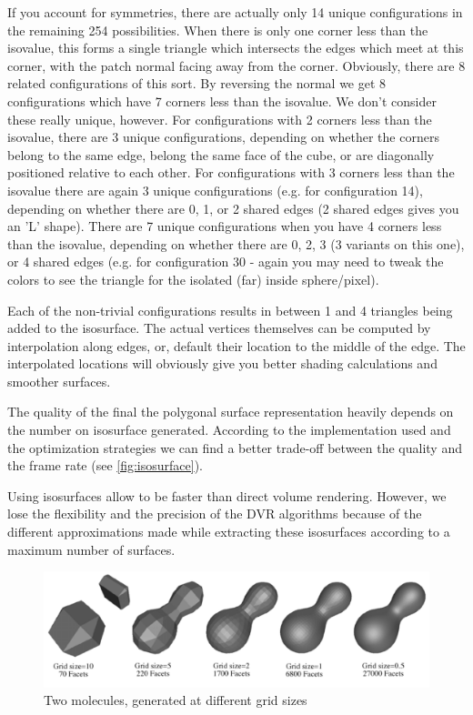 If you account for symmetries, there are actually only 14 unique configurations in the remaining 254 possibilities. When there is only one corner less than the isovalue, this forms a single triangle which intersects the edges which meet at this corner, with the patch normal facing away from the corner. Obviously, there are 8 related configurations of this sort. By reversing the normal we get 8 configurations which have 7 corners less than the isovalue. We don't consider these really unique, however. For configurations with 2 corners less than the isovalue, there are 3 unique configurations, depending on whether the corners belong to the same edge, belong the same face of the cube, or are diagonally positioned relative to each other. For configurations with 3 corners less than the isovalue there are again 3 unique configurations (e.g. for configuration 14), depending on whether there are 0, 1, or 2 shared edges (2 shared edges gives you an 'L' shape). There are 7 unique configurations when you have 4 corners less than the isovalue, depending on whether there are 0, 2, 3 (3 variants on this one), or 4 shared edges (e.g. for configuration 30 - again you may need to tweak the colors to see the triangle for the isolated (far) inside sphere/pixel).

Each of the non-trivial configurations results in between 1 and 4 triangles being added to the isosurface. The actual vertices themselves can be computed by interpolation along edges, or, default their location to the middle of the edge. The interpolated locations will obviously give you better shading calculations and smoother surfaces.

The quality of the final the polygonal surface representation heavily depends on the number on isosurface generated. According to the implementation used and the optimization strategies we can find a better trade-off between the quality and the frame rate (see \autoref{fig:isosurface}). 


Using isosurfaces allow to be faster than direct volume rendering. However, we lose the flexibility and the precision of the DVR algorithms because of the different approximations made while extracting these isosurfaces according to a maximum number of surfaces. 


\begin{figure}
\centering
\includegraphics[width=\textwidth]{Figures/isosurface}
\caption[Volume raycasting]{ Two  molecules, generated at different grid sizes }
\label{fig:isosurface}
\end{figure}

